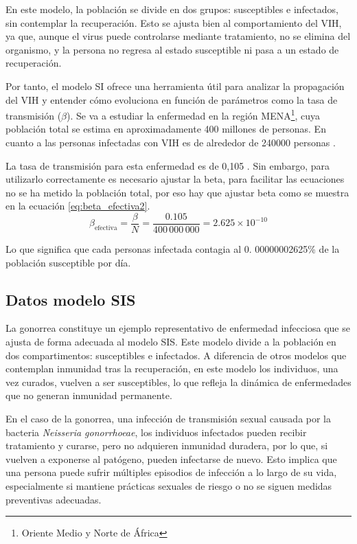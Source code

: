 En este modelo, la población se divide en dos grupos: susceptibles e infectados, sin contemplar la recuperación. Esto se ajusta bien al comportamiento del VIH, ya que, aunque el virus puede controlarse mediante tratamiento, no se elimina del organismo, y la persona no regresa al estado susceptible ni pasa a un estado de recuperación.

Por tanto, el modelo SI ofrece una herramienta útil para analizar la propagación del VIH y entender cómo evoluciona en función de parámetros como la tasa de transmisión ($\beta$). 
Se va a estudiar la enfermedad en la región MENA\footnote{Oriente Medio y Norte de África}, cuya población total se estima en aproximadamente 400 millones de personas. En cuanto a las personas infectadas con VIH es de alrededor de 240000 personas \cite{Khorrami2023}.

La tasa de transmisión para esta enfermedad es de 0,105 \cite{shakiba2021epidemiological}. Sin embargo, para utilizarlo correctamente es necesario ajustar la beta, para facilitar las ecuaciones no se ha metido la población total, por eso hay que ajustar beta como se muestra en la ecuación \eqref{eq:beta_efectiva2}.
\begin{equation}
\beta_{\text{efectiva}} = \frac{\beta}{N} = \frac{0.105}{400\,000\,000} = 2.625 \times 10^{-10}
\label{eq:beta_efectiva2}
\end{equation}

Lo que significa que cada personas infectada contagia al 0. 00000002625\% de la población susceptible por día.

\subsection{Datos modelo SIS}
La gonorrea constituye un ejemplo representativo de enfermedad infecciosa que se ajusta de forma adecuada al modelo SIS. Este modelo divide a la población en dos compartimentos: susceptibles e infectados. A diferencia de otros modelos que contemplan inmunidad tras la recuperación, en este modelo los individuos, una vez curados, vuelven a ser susceptibles, lo que refleja la dinámica de enfermedades que no generan inmunidad permanente.

En el caso de la gonorrea, una infección de transmisión sexual causada por la bacteria \textit{Neisseria gonorrhoeae}, los individuos infectados pueden recibir tratamiento y curarse, pero no adquieren inmunidad duradera, por lo que, si vuelven a exponerse al patógeno, pueden infectarse de nuevo. Esto implica que una persona puede sufrir múltiples episodios de infección a lo largo de su vida, especialmente si mantiene prácticas sexuales de riesgo o no se siguen medidas preventivas adecuadas.

